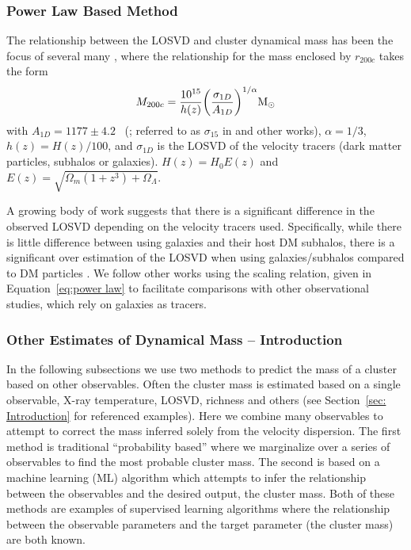 \documentclass[fleqn,usenatbib]{mnras}
\begin{document}
\subsubsection{Power Law Based Method}
The relationship between the LOSVD and cluster dynamical mass has been the focus of several many , where the relationship for the mass enclosed by $r_{200c}$ takes the form
\begin{equation}\label{eq:power law}
	M_{200c} = \frac{10^{15}}{h(z)} \bigg{(}\frac{\sigma_{1D}}{A_{1D}} \bigg{)}^{1/\alpha} \hbox{$\mathrm{M}_\odot$}
\end{equation}
with $A_{1D} = 1177 \pm 4.2$ \kms\ (\citealt{Munari2013}; referred to as $\sigma_{15}$ in \citealt{Evrard2008} and other works), $\alpha = 1/3$, $h(z) = H(z)/100$, and $\sigma_{1D}$ is the LOSVD of the velocity tracers (dark matter particles, subhalos or galaxies). $H(z) = H_0 E(z)$ and $E(z) = \sqrt{\Omega_m(1+z^3)+\Omega_{\Lambda}}$.

A growing body of work suggests that there is a significant difference in the observed LOSVD depending on the velocity tracers used. Specifically, while there is little difference between using galaxies and their host DM subhalos, there is a significant over estimation of the LOSVD when using galaxies/subhalos compared to DM particles \citep{Munari2013}. We follow other works  using the scaling relation, given in Equation~\ref{eq:power law} to facilitate comparisons with other observational studies, which rely on galaxies as tracers. 

\subsubsection{Other Estimates of Dynamical Mass -- Introduction}
In the following subsections we use two methods to predict the mass of a cluster based on other observables. Often the cluster mass is estimated based on a single observable, X-ray temperature, LOSVD, richness and others (see Section~\ref{sec: Introduction} for referenced examples). Here we combine many observables to attempt to correct the mass inferred solely from the velocity dispersion. The first method is traditional ``probability based'' where we marginalize over a series of observables to find the most probable cluster mass. The second is based on a machine learning (ML) algorithm which attempts to infer the relationship between the observables and the desired output, the cluster mass. Both of these methods are examples of supervised learning algorithms where the relationship between the observable parameters and the target parameter (the cluster mass) are both known.
\end{document}
